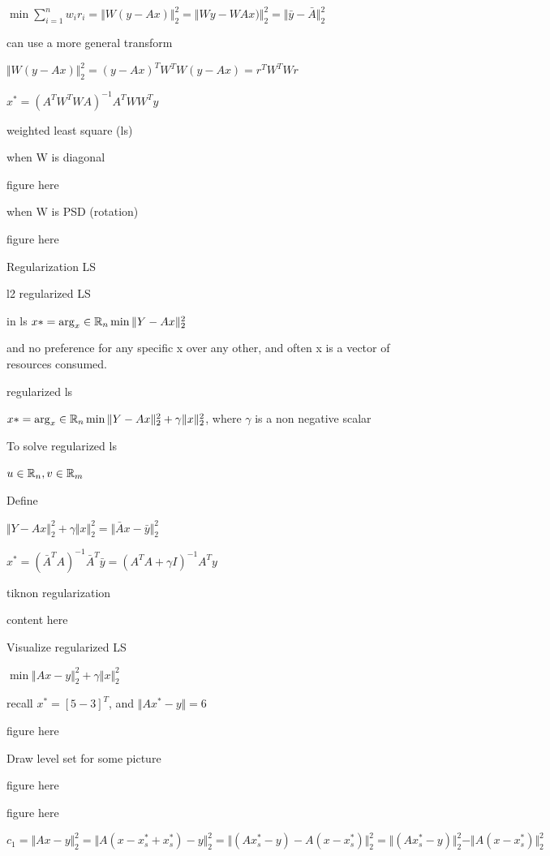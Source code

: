 $\min \sum_{i=1}^{n} w_i r_i=\Vert W (y-Ax)\Vert ^2_2=\Vert Wy-WAx)\Vert ^2_2=\Vert \bar{y}-\bar{A} \Vert ^2_2$

can use a more general transform 

$\Vert W (y-Ax)\Vert ^2_2 = (y-Ax)^TW^TW(y-Ax)=r^TW^TWr$

$x^*=(A^TW^TWA)^{-1}A^TWW^Ty$




weighted least square (ls) 

when W is diagonal 

figure here

when W is PSD (rotation)

figure here




Regularization LS

l2 regularized LS

in ls $x*=\arg_x\in\mathbb{R}_{n} \min \Vert Y-Ax\Vert ^2_2$

and no preference for any specific x over any other, and often x is a vector of resources consumed.

regularized ls

$x*=\arg_x\in\mathbb{R}_{n} \min \Vert Y-Ax\Vert ^2_2 + \gamma \Vert x\Vert ^2_2$, where $\gamma$ is a non negative scalar


To solve regularized ls

$u\in\mathbb{R}_{n}, v\in\mathbb{R}_{m}$


Define


$\Vert Y-Ax\Vert ^2_2 + \gamma \Vert x\Vert ^2_2=\Vert \bar{A}x-\bar{y}\Vert^2_2$

$x^*=(\bar{A}^TA)^{-1}\bar{A}^T\bar{y}=(A^TA+\gamma I)^{-1}A^Ty$


tiknon regularization

content here


Visualize regularized LS

$\min \Vert Ax-y\Vert_2^2 +\gamma\Vert x\Vert^2_2$

recall $x^*=[5 -3]^T$, and $\Vert Ax^*-y\Vert = 6$

figure here


Draw level set for some picture

figure here

figure here



$c_1=\Vert Ax-y\Vert^2_2=\Vert A(x-x_s^*+x_s^*)-y\Vert^2_2=\Vert (Ax_s^*-y)-A(x-x_s^*)\Vert^2_2=\Vert (Ax_s^*-y)\Vert^2_2 - \Vert A(x-x_s^*)\Vert^2_2$

